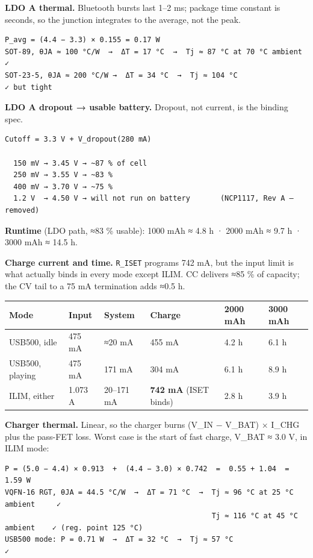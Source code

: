 \documentclass[11pt]{article}
\begin{document}
\textbf{LDO A thermal.} Bluetooth bursts last 1–2 ms; package time constant is seconds, so the
junction integrates to the average, not the peak.

\begin{Verbatim}
P_avg = (4.4 − 3.3) × 0.155 = 0.17 W
SOT-89, θJA ≈ 100 °C/W  →  ΔT = 17 °C  →  Tj ≈ 87 °C at 70 °C ambient      ✓
SOT-23-5, θJA ≈ 200 °C/W →  ΔT = 34 °C  →  Tj ≈ 104 °C                     ✓ but tight
\end{Verbatim}

\textbf{LDO A dropout → usable battery.} Dropout, not current, is the binding spec.

\begin{Verbatim}
Cutoff = 3.3 V + V_dropout(280 mA)

  150 mV → 3.45 V → ~87 % of cell
  250 mV → 3.55 V → ~83 %
  400 mV → 3.70 V → ~75 %
  1.2 V  → 4.50 V → will not run on battery       (NCP1117, Rev A — removed)
\end{Verbatim}

\textbf{Runtime} (LDO path, ≈83 \% usable): 1000 mAh ≈ 4.8 h · 2000 mAh ≈ 9.7 h · 3000 mAh ≈ 14.5 h.

\textbf{Charge current and time.} \texttt{R_ISET} programs 742 mA, but the input limit is what
actually binds in every mode except ILIM. CC delivers ≈85 \% of capacity; the CV tail to a 75 mA
termination adds ≈0.5 h.

\begin{tabularx}{\linewidth}{@{}l l l l l l@{}}
\toprule
\textbf{Mode} & \textbf{Input} & \textbf{System} & \textbf{Charge} & \textbf{2000 mAh} & \textbf{3000 mAh} \\
\midrule
USB500, idle & 475 mA & ≈20 mA & 455 mA & 4.2 h & 6.1 h \\
USB500, playing & 475 mA & 171 mA & 304 mA & 6.1 h & 8.9 h \\
ILIM, either & 1.073 A & 20–171 mA & \textbf{742 mA} (ISET binds) & 2.8 h & 3.9 h \\
\bottomrule
\end{tabularx}

\textbf{Charger thermal.} Linear, so the charger burns (V_IN − V_BAT) × I_CHG plus the pass-FET loss.
Worst case is the start of fast charge, V_BAT ≈ 3.0 V, in ILIM mode:

\begin{Verbatim}
P = (5.0 − 4.4) × 0.913  +  (4.4 − 3.0) × 0.742  =  0.55 + 1.04  =  1.59 W
VQFN-16 RGT, θJA = 44.5 °C/W  →  ΔT = 71 °C  →  Tj ≈ 96 °C at 25 °C ambient     ✓
                                                Tj ≈ 116 °C at 45 °C ambient    ✓ (reg. point 125 °C)
USB500 mode: P = 0.71 W  →  ΔT = 32 °C  →  Tj ≈ 57 °C                           ✓
\end{Verbatim}
\end{document}

